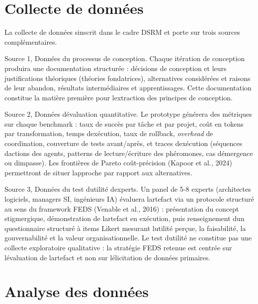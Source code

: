 \section{Collecte de données}\label{collecte-de-donnuxe9es}

La collecte de données s\textquotesingle inscrit dans le cadre DSRM et
porte sur trois sources complémentaires.

Source 1, Données du processus de conception.
Chaque itération de conception produira une documentation structurée :
décisions de conception et leurs justifications théoriques (théories
fondatrices), alternatives considérées et raisons de leur abandon,
résultats intermédiaires et apprentissages. Cette documentation
constitue la matière première pour l\textquotesingle extraction des
principes de conception.

Source 2, Données d\textquotesingle évaluation quantitative.
Le prototype générera des métriques sur chaque benchmark : taux de
succès par tâche et par projet, coût en tokens par transformation,
temps d\textquotesingle exécution, taux de rollback, \emph{overhead}
de coordination, couverture de tests avant/après, et traces
d\textquotesingle exécution (séquences d\textquotesingle actions des
agents, patterns de lecture/écriture des phéromones, cas
d\textquotesingle émergence ou d\textquotesingle impasse). Les
frontières de Pareto coût-précision (Kapoor et al., 2024) permettront de
situer l\textquotesingle approche par rapport aux alternatives.

Source 3, Données du test d\textquotesingle utilité d\textquotesingle experts.
Un panel de 5-8 experts (architectes logiciels, managers SI, ingénieurs
IA) évaluera l\textquotesingle artefact via un protocole structuré au
sens du framework FEDS (Venable et al., 2016) : présentation du concept
stigmergique, démonstration de l\textquotesingle artefact en exécution,
puis renseignement d\textquotesingle un questionnaire structuré à items
Likert mesurant l\textquotesingle utilité perçue, la faisabilité, la
gouvernabilité et la valeur organisationnelle. Le test d\textquotesingle utilité
ne constitue pas une collecte exploratoire qualitative : la stratégie
FEDS retenue est centrée sur l\textquotesingle évaluation de
l\textquotesingle artefact et non sur l\textquotesingle élicitation de
données primaires.

\section{Analyse des données}\label{analyse-des-donnuxe9es}

